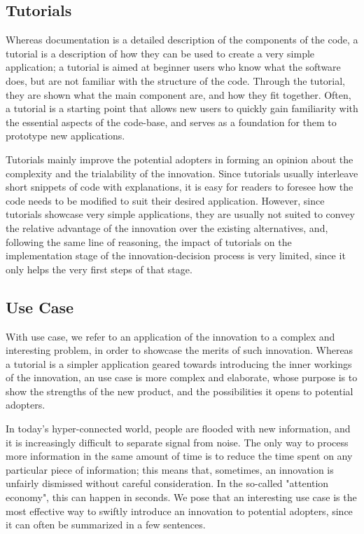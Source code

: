 \documentclass[12pt]{article}
\begin{document}
\subsection{Tutorials}
\label{sec:org3aa77c0}
Whereas documentation is a detailed description of the components of the code, a tutorial is a description of how they can be used to create a very simple application; a tutorial is aimed at beginner users who know what the software does, but are not familiar with the structure of the code. Through the tutorial, they are shown what the main component are, and how they fit together. Often, a tutorial is a starting point that allows new users to quickly gain familiarity with the essential aspects of the code-base, and serves as a foundation for them to prototype new applications.

Tutorials mainly improve the potential adopters in forming an opinion about the complexity and the trialability of the innovation. Since tutorials usually interleave short snippets of code with explanations, it is easy for readers to foresee how the code needs to be modified to suit their desired application. However, since tutorials showcase very simple applications, they are usually not suited to convey the relative advantage of the innovation over the existing alternatives, and, following the same line of reasoning, the impact of tutorials on the implementation stage of the innovation-decision process is very limited, since it only helps the very first steps of that stage.

\subsection{Use Case}
\label{sec:org38c711b}
With use case, we refer to an application of the innovation to a complex and interesting problem, in order to showcase the merits of such innovation. Whereas a tutorial is a simpler application geared towards introducing the  inner workings of the innovation, an use case is more complex and elaborate, whose purpose is to show the strengths of the new product, and the possibilities it opens to potential adopters.

In today's hyper-connected world, people are flooded with new information, and it is increasingly difficult to separate signal from noise. The only way to process more information in the same amount of time is to reduce the time spent on any particular piece of information; this means that, sometimes, an innovation is unfairly dismissed without careful consideration. In the so-called "attention economy", this can happen in seconds. We pose that an interesting use case is the most effective way to swiftly introduce an innovation to potential adopters, since it can often be summarized in a few sentences.
\end{document}
